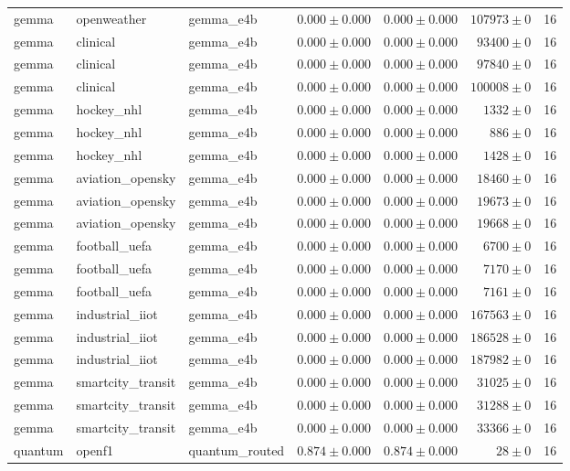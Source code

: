 \begin{table}[htbp]
\begin{tabular}{l l l r r r r}
gemma & openweather & gemma\_e4b & $0.000\pm0.000$ & $0.000\pm0.000$ & $107973\pm0$ & 16 \\
gemma & clinical & gemma\_e4b & $0.000\pm0.000$ & $0.000\pm0.000$ & $93400\pm0$ & 16 \\
gemma & clinical & gemma\_e4b & $0.000\pm0.000$ & $0.000\pm0.000$ & $97840\pm0$ & 16 \\
gemma & clinical & gemma\_e4b & $0.000\pm0.000$ & $0.000\pm0.000$ & $100008\pm0$ & 16 \\
gemma & hockey\_nhl & gemma\_e4b & $0.000\pm0.000$ & $0.000\pm0.000$ & $1332\pm0$ & 16 \\
gemma & hockey\_nhl & gemma\_e4b & $0.000\pm0.000$ & $0.000\pm0.000$ & $886\pm0$ & 16 \\
gemma & hockey\_nhl & gemma\_e4b & $0.000\pm0.000$ & $0.000\pm0.000$ & $1428\pm0$ & 16 \\
gemma & aviation\_opensky & gemma\_e4b & $0.000\pm0.000$ & $0.000\pm0.000$ & $18460\pm0$ & 16 \\
gemma & aviation\_opensky & gemma\_e4b & $0.000\pm0.000$ & $0.000\pm0.000$ & $19673\pm0$ & 16 \\
gemma & aviation\_opensky & gemma\_e4b & $0.000\pm0.000$ & $0.000\pm0.000$ & $19668\pm0$ & 16 \\
gemma & football\_uefa & gemma\_e4b & $0.000\pm0.000$ & $0.000\pm0.000$ & $6700\pm0$ & 16 \\
gemma & football\_uefa & gemma\_e4b & $0.000\pm0.000$ & $0.000\pm0.000$ & $7170\pm0$ & 16 \\
gemma & football\_uefa & gemma\_e4b & $0.000\pm0.000$ & $0.000\pm0.000$ & $7161\pm0$ & 16 \\
gemma & industrial\_iiot & gemma\_e4b & $0.000\pm0.000$ & $0.000\pm0.000$ & $167563\pm0$ & 16 \\
gemma & industrial\_iiot & gemma\_e4b & $0.000\pm0.000$ & $0.000\pm0.000$ & $186528\pm0$ & 16 \\
gemma & industrial\_iiot & gemma\_e4b & $0.000\pm0.000$ & $0.000\pm0.000$ & $187982\pm0$ & 16 \\
gemma & smartcity\_transit & gemma\_e4b & $0.000\pm0.000$ & $0.000\pm0.000$ & $31025\pm0$ & 16 \\
gemma & smartcity\_transit & gemma\_e4b & $0.000\pm0.000$ & $0.000\pm0.000$ & $31288\pm0$ & 16 \\
gemma & smartcity\_transit & gemma\_e4b & $0.000\pm0.000$ & $0.000\pm0.000$ & $33366\pm0$ & 16 \\
quantum & openf1 & quantum\_routed & $0.874\pm0.000$ & $0.874\pm0.000$ & $28\pm0$ & 16 \\

\end{tabular}
\end{table}
